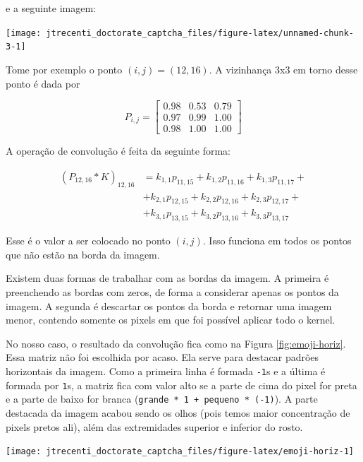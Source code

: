 \documentclass[12pt,]{report}
\let\origfigure\figure
\let\endorigfigure\endfigure
\renewenvironment{figure}[1][2] {
    \expandafter\origfigure\expandafter[H]
} {
    \endorigfigure
}
\begin{document}
e a seguinte imagem:

\begin{center}\texttt{[image: jtrecenti\_doctorate\_captcha\_files/figure-latex/unnamed-chunk-3-1]} \end{center}

Tome por exemplo o ponto \((i,j) = (12,16)\). A vizinhança 3x3 em torno
desse ponto é dada por

\[
P_{i,j} = \left[\begin{array}{rrr}
0.98 & 0.53 & 0.79 \\ 
0.97 & 0.99 & 1.00 \\ 
0.98 & 1.00 & 1.00 
\end{array}\right]
\]

A operação de convolução é feita da seguinte forma:

\[
\begin{aligned}
(P_{12,16} *K )_{12,16}
&= k_{1,1}p_{11,15} + k_{1,2}p_{11,16} + k_{1,3}p_{11,17} + \\
&+ k_{2,1}p_{12,15} + k_{2,2}p_{12,16} + k_{2,3}p_{12,17} + \\
&+ k_{3,1}p_{13,15} + k_{3,2}p_{13,16} + k_{3,3}p_{13,17}
\end{aligned}
\]

Esse é o valor a ser colocado no ponto \((i,j)\). Isso funciona em todos
os pontos que não estão na borda da imagem.

Existem duas formas de trabalhar com as bordas da imagem. A primeira é
preenchendo as bordas com zeros, de forma a considerar apenas os pontos
da imagem. A segunda é descartar os pontos da borda e retornar uma
imagem menor, contendo somente os pixels em que foi possível aplicar
todo o kernel.

No nosso caso, o resultado da convolução fica como na Figura
\ref{fig:emoji-horiz}. Essa matriz não foi escolhida por acaso. Ela
serve para destacar padrões horizontais da imagem. Como a primeira linha
é formada \texttt{-1}s e a última é formada por \texttt{1}s, a matriz
fica com valor alto se a parte de cima do pixel for preta e a parte de
baixo for branca (\texttt{grande\ *\ 1\ +\ pequeno\ *\ (-1)}). A parte
destacada da imagem acabou sendo os olhos (pois temos maior concentração
de pixels pretos ali), além das extremidades superior e inferior do
rosto.

\begin{figure}

{\centering \texttt{[image: jtrecenti\_doctorate\_captcha\_files/figure-latex/emoji-horiz-1]} 

}

\caption{Figura após aplicação de convolução.}\label{fig:emoji-horiz}
\end{figure}
\end{document}
